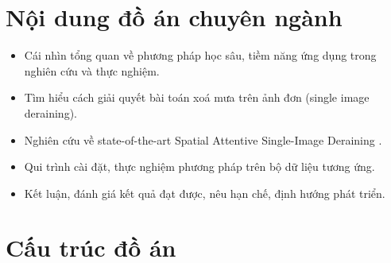 \section{Nội dung đồ án chuyên ngành}
\begin{itemize}
    \item Cái nhìn tổng quan về phương pháp học sâu, tiềm năng ứng dụng trong nghiên cứu và thực nghiệm.
    \item Tìm hiểu cách giải quyết bài toán xoá mưa trên ảnh đơn (single image deraining).
    \item Nghiên cứu về state-of-the-art Spatial Attentive Single-Image Deraining \cite{wang2019spatial}.
    \item Qui trình cài đặt, thực nghiệm phương pháp trên bộ dữ liệu tương ứng.
    \item Kết luận, đánh giá kết quả đạt được, nêu hạn chế, định hướng phát triển.
\end{itemize}

\section{Cấu trúc đồ án}
\hspace{10mm}{Phần còn lại của khóa luận được tổ chức như sau: Ở chương 2 chúng tôi sẽ trình bày các cơ sở lý thuyết phục vụ cho bài toán và trình bày chi tiết các phần quan trọng trong state-of-the-art Spatial Attentive Network. Chương 3 chúng tôi sẽ trình bày môi trường và cách thức chạy thực nghiệm, kết quả đánh giá hiệu suất và nhận xét. Chương 4 đưa ra kết luận và tổng kết về những gì đạt được, cùng với đó là đề ra các hướng nghiên cứu trong tương lai.}